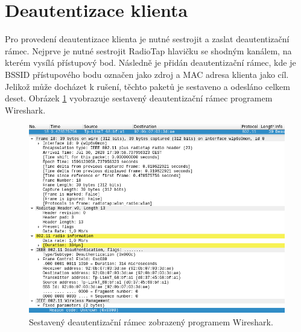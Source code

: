 \section{Deautentizace klienta}
Pro provedení deautentizace klienta je nutné sestrojit a zaslat deautentizační rámec. Nejprve je nutné sestrojit RadioTap hlavičku se shodným kanálem, na kterém vysílá přístupový bod. Následně je přidán deautentizační rámec, kde je BSSID přístupového bodu označen jako zdroj a MAC adresa klienta jako cíl. Jelikož může docházet k rušení, těchto paketů je sestaveno a odesláno celkem deset. Obrázek \ref{img:deauth-wireshark} vyobrazuje sestavený deautentizační rámec programem Wireshark.
\begin{figure}[htbp]
  \centering
  \includegraphics[width=14.9cm]{obrazky-figures/deauth-wireshark.png}
  \caption{Sestavený deautentizační rámec zobrazený programem Wireshark.}
  \label{img:deauth-wireshark}
\end{figure} 

